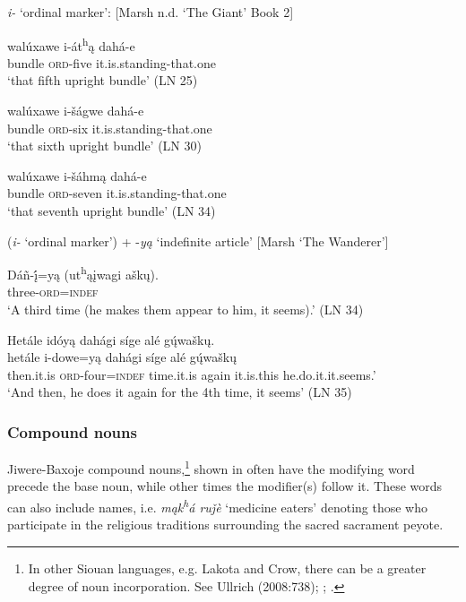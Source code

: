 \documentclass[output=paper]{LSP/langsci}
\begin{document}
\begin{exe}
\ex  \textit{i-} `ordinal marker':    [Marsh n.d. `The Giant' Book 2]
\begin{xlist}	
\ex 
\gll  walúxawe i-át\textsuperscript{h}\k{a}  dahá-e   \\
bundle      \textsc{ord}-five     it.is.standing-that.one \\
\trans `that fifth upright bundle' (LN 25) 
			
\ex 
\gll  walúxawe i-\v{s}ágwe dahá-e  \\
bundle      \textsc{ord}-six     it.is.standing-that.one \\
\trans `that sixth upright bundle' (LN 30)

\ex 
\gll walúxawe  i-\v{s}áhm\k{a}  dahá-e \\  
bundle     \textsc{ord}-seven    it.is.standing-that.one \\
\trans {}`that seventh upright bundle' (LN 34)
\end{xlist}
\ex (\textit{i-} `ordinal marker') + -\textit{y\k{a}} `indefinite article' [Marsh `The Wanderer']
\begin{xlist}
\ex \gll Dá\~n-\k{\'i}=y\k{a}     (ut\textsuperscript{h}\k{a}\k{i}wagi  a\v{s}k\k{u}).   \\
	three-\textsc{ord}=\textsc{indef} {} {} \\
\trans `A third time (he makes them appear to him, it seems).'	 (LN 34)  
		 
\ex 
\glll Hetále    id\'oy\k{a} dahági   s\'ige   al\'e   g\k{ú}wa\v{s}k\k{u}. \\
hetále i-dowe=y\k{a}  dahági s\'ige   al\'e   g\k{ú}wa\v{s}k\k{u} \\		   
then.it.is \textsc{ord}-four=\textsc{indef} time.it.is  again it.is.this he.do.it.it.seems.' \\ 
\trans `And then, he does it again for the 4th time, it seems' (LN 35)
\end{xlist}
\end{exe}
\subsubsection{Compound nouns} 
Jiwere-Baxoje compound nouns,\footnote{In other Siouan languages, e.g. Lakota and Crow, there can be a greater degree of noun incorporation. See Ullrich (2008:738); \citet{DeReuse1994}; \citet{Gracyzk1991}.} shown in  often have the modifying word precede the base noun, while other times the modifier(s) follow it. These words can also include names, i.e. \textit{m\k{a}k\textsuperscript{h}á  ru\v{j}\`e} `medicine eaters' denoting those who participate in the religious traditions surrounding the sacred sacrament peyote.  
\end{document}
